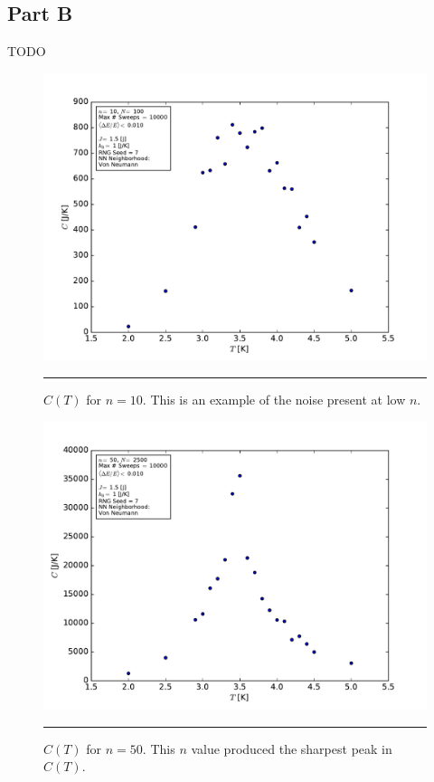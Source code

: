 \documentclass[notitlepage,aps,prd,nofootinbib]{revtex4-1}
\begin{document}
\clearpage
\subsection{Part B}
\label{subsec:results_part_b}
TODO


\begin{figure}[!htbc]
  \centering
  \includegraphics[width=.8\textwidth]{../output/plots_for_paper_von_neumann/part_b/CT_for_n10.pdf}
	{\par\nobreak\rule[9pt]{35em}{0.5pt}\vspace{-5mm}}
	\caption{$C\left(T\right)$ for $n=10$. This is an example of the noise present at low $n$.}
	\label{fig:CT_n10}
\end{figure}

\clearpage
\begin{figure}[!htbc]
  \centering
  \includegraphics[width=.75\textwidth]{../output/plots_for_paper_von_neumann/part_b/CT_for_n50.pdf}
	{\par\nobreak\rule[9pt]{35em}{0.5pt}\vspace{-5mm}}
	\caption{$C\left(T\right)$ for $n=50$. This $n$ value produced the sharpest peak in $C\left(T\right)$.}
	\label{fig:CT_n50}
\end{figure}
\end{document}
